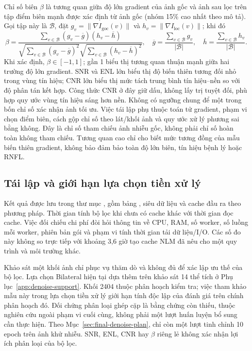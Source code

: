 Chỉ số biên $\beta$ là tương quan giữa độ lớn gradient của ảnh gốc và ảnh
sau lọc trên tập điểm biên mạnh được xác định từ ảnh gốc (nhóm 15\% cao
nhất theo mô tả). Gọi tập này là $\mathcal B$, đặt
$g_v=\|\nabla I_{\mathrm{goc}}(v)\|$ và
$h_v=\|\nabla I_{\mathrm{loc}}(v)\|$; khi đó
\begin{equation}
 \beta=\frac{\sum_{v\in\mathcal B}(g_v-\overline g)(h_v-\overline h)}
  {\sqrt{\sum_{v\in\mathcal B}(g_v-\overline g)^2}
  \sqrt{\sum_{v\in\mathcal B}(h_v-\overline h)^2}},\quad
 \overline g=\frac{\sum_{v\in\mathcal B}g_v}{|\mathcal B|},\quad
 \overline h=\frac{\sum_{v\in\mathcal B}h_v}{|\mathcal B|}.
 \label{eq:denoise-gradient-correlation}
\end{equation}
Khi xác định, $\beta\in[-1,1]$; gần 1 biểu thị tương quan thuận mạnh
giữa hai trường độ lớn gradient. SNR và ENL lớn biểu thị độ biến thiên
tương đối nhỏ trong vùng tín hiệu; CNR lớn biểu thị mức tách trung bình
tín hiệu--nền so với độ phân tán kết hợp. Công thức CNR ở đây giữ dấu,
không lấy trị tuyệt đối, phù hợp quy ước vùng tín hiệu sáng hơn nền.
Không có ngưỡng chung để một trong bốn chỉ số xác nhận ảnh tối ưu.
Việc tái lập phụ thuộc toán tử gradient, phạm vi chọn điểm biên, cách
gộp chỉ số theo lát/khối ảnh và quy ước xử lý phương sai bằng không. Đây là chỉ số
tham chiếu ảnh nhiễu gốc, không phải chỉ số hoàn toàn không tham chiếu.
Tương quan cao chỉ cho biết mức tương đồng của mẫu biến thiên gradient,
không bảo đảm bảo toàn độ lớn biên, tín hiệu bệnh lý hoặc RNFL.

\subsection{Tái lập và giới hạn lựa chọn tiền xử lý}
Kết quả được lưu trong thư mục , gồm bảng
, siêu dữ liệu
 và cache đầu ra theo phương pháp.
Thời gian tính bộ lọc khi chưa có cache khác với thời gian đọc cache.
Việc đối chiếu chi phí đòi hỏi thông tin về CPU, RAM, số worker, số luồng mỗi worker,
phiên bản gói và phạm vi tính thời gian tải dữ liệu/I/O.
Các số đo này không so trực tiếp với khoảng 3,6 giờ tạo cache NLM đã nêu
cho một quy trình và môi trường khác.

Khảo sát một khối ảnh chỉ phục vụ thăm dò và không đủ để xác lập ưu
thế của bộ lọc. Lựa chọn Bilateral hiện tại dựa thêm trên khảo sát
14 thể tích ở Phụ lục~\ref{app:denoise-support}. Khối 2404 thuộc phân
hoạch kiểm tra; việc tham khảo mẫu này trong lựa chọn tiền xử lý
giới hạn tính độc lập của đánh giá trên chính phân hoạch đó. Đối
chứng phân loại ghép cặp là bằng chứng còn thiếu, thuộc nghiên cứu
ngoài phạm vi cuối cùng, không phải một lượt huấn luyện bổ sung
cần thực hiện. Theo Mục~\ref{sec:final-denoise-plan}, chỉ còn một
lượt tinh chỉnh 10 epoch trên ảnh khử nhiễu. SNR, ENL, CNR hay
$\beta$ riêng lẻ không xác nhận lợi ích phân loại của bộ lọc.
